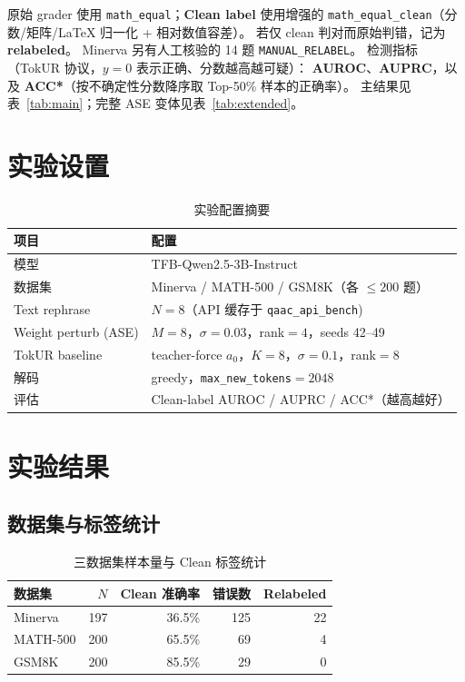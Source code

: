 \documentclass[11pt,a4paper]{article}
\begin{document}
原始 grader 使用 \texttt{math\_equal}；\textbf{Clean label} 使用增强的
\texttt{math\_equal\_clean}（分数/矩阵/LaTeX 归一化 + 相对数值容差）。
若仅 clean 判对而原始判错，记为 \textbf{relabeled}。
Minerva 另有人工核验的 14 题 \texttt{MANUAL\_RELABEL}。
检测指标（TokUR 协议，$y{=}0$ 表示正确、分数越高越可疑）：
\textbf{AUROC}、\textbf{AUPRC}，以及 \textbf{ACC*}（按不确定性分数降序取 Top-50\% 样本的正确率）。
主结果见表~\ref{tab:main}；完整 ASE 变体见表~\ref{tab:extended}。

\section{实验设置}

\begin{table}[h]
  \centering
  \caption{实验配置摘要}
  \label{tab:setup}
  \begin{tabular}{ll}
    \toprule
    项目 & 配置 \\
    \midrule
    模型 & TFB-Qwen2.5-3B-Instruct \\
    数据集 & Minerva / MATH-500 / GSM8K（各 $\leq 200$ 题） \\
    Text rephrase & $N{=}8$（API 缓存于 \texttt{qaac\_api\_bench}) \\
    Weight perturb (ASE) & $M{=}8$，$\sigma{=}0.03$，rank$=4$，seeds 42--49 \\
    TokUR baseline & teacher-force $a_0$，$K{=}8$，$\sigma{=}0.1$，rank$=8$ \\
    解码 & greedy，\texttt{max\_new\_tokens}$=2048$ \\
    评估 & Clean-label AUROC / AUPRC / ACC*（越高越好） \\
    \bottomrule
  \end{tabular}
\end{table}

\section{实验结果}

\subsection{数据集与标签统计}

\begin{table}[h]
  \centering
  \caption{三数据集样本量与 Clean 标签统计}
  \label{tab:label}
  \begin{tabular}{lrrrr}
    \toprule
    数据集 & $N$ & Clean 准确率 & 错误数 & Relabeled \\
    \midrule
    Minerva   & 197 & 36.5\% & 125 & 22 \\
    MATH-500  & 200 & 65.5\% & 69  & 4  \\
    GSM8K     & 200 & 85.5\% & 29  & 0  \\
    \bottomrule
  \end{tabular}
\end{table}
\end{document}
